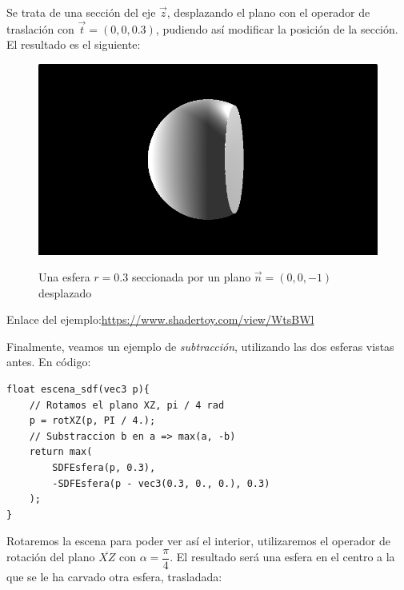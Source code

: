Se trata de una sección del eje \(\Vec{z}\), desplazando el plano con el operador de traslación con \(\Vec{t}=(0,0,0.3)\), pudiendo así modificar la posición de la sección. El resultado es el siguiente:

\begin{figure}[H]
  \centering
  \captionsetup{justification=centering}%
  \includegraphics[width=1.0\textwidth]{secciones/imagenes/sdf/3d/sdf_seccion_3d.png}\label{fig:seccion}
  \caption{Una esfera \(r=0.3\) seccionada por un plano \(\Vec{n}=(0,0,-1)\) desplazado}
\end{figure}

Enlace del ejemplo:\url{https://www.shadertoy.com/view/WtsBWl}

Finalmente, veamos un ejemplo de \textit{subtracción}, utilizando las dos esferas vistas antes. En código:

\begin{lstlisting}
float escena_sdf(vec3 p){
    // Rotamos el plano XZ, pi / 4 rad
    p = rotXZ(p, PI / 4.);
    // Substraccion b en a => max(a, -b)
    return max(
        SDFEsfera(p, 0.3),
        -SDFEsfera(p - vec3(0.3, 0., 0.), 0.3)
    );
}
\end{lstlisting}


Rotaremos la escena para poder ver así el interior, utilizaremos el operador de rotación del plano \(\overline{XZ}\) con \(\alpha=\dfrac{\pi}{4}\). El resultado será una esfera en el centro a la que se le ha carvado otra esfera, trasladada:

